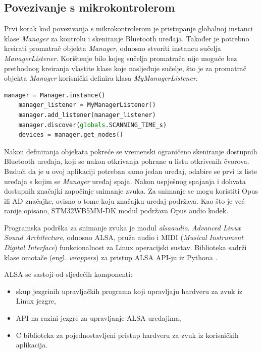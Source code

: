 \subsection{Povezivanje s mikrokontrolerom}

Prvi korak kod povezivanja s mikrokontrolerom je pristupanje globalnoj instanci klase \textit{Manager} za kontrolu i skeniranje Bluetooth uređaja. Također je potrebno kreirati promatrač objekta \textit{Manager}, odnosno stvoriti instancu sučelja \textit{ManagerListener}. Korištenje bilo kojeg sučelja promatrača nije moguće bez prethodnog kreiranja vlastite klase koje nasljeđuje sučelje, što je za promatrač objekta \textit{Manager} korisnički definira klasa \textit{MyManagerListener}. 

\begin{lstlisting}[language=Python, caption={Pristup instanci \textit{Manager} i skeniranje Bluetooth uređaja}]
	manager = Manager.instance()
	manager_listener = MyManagerListener()
	manager.add_listener(manager_listener)
	manager.discover(globals.SCANNING_TIME_s)
	devices = manager.get_nodes()
\end{lstlisting}

Nakon definiranja objekata pokreće se vremenski ograničeno skeniranje dostupnih Bluetooth uređaja, koji se nakon otkrivanja pohrane u listu otkrivenih čvorova. Budući da je u ovoj aplikaciji potreban samo jedan uređaj, odabire se prvi iz liste uređaja s kojim se \textit{Manager} uređaj spaja. Nakon uspješnog spajanja i dohvata dostupnih značajki započinje snimanje zvuka. Za snimanje se mogu koristiti Opus ili AD značajke, ovisno o tome koju značajku uređaj podržava. Kao što je već ranije opisano, STM32WB5MM-DK modul podržava Opus audio kodek.

Programska podrška za snimanje zvuka je modul \textit{alsaaudio}. \textit{Advanced Linux Sound Architecture}, odnosno ALSA, pruža audio i MIDI (\textit{Musical Instrument Digital Interface}) funkcionalnost za Linux operacijski sustav. Biblioteka sadrži klase omotače (engl. \textit{wrappers}) za pristup ALSA API-ju iz Pythona \cite{alsaaudio}. 

ALSA se sastoji od sljedećih komponenti:
\begin{itemize}
	\item skup jezgrinih upravljačkih programa koji upravljaju hardveru za zvuk iz Linux jezgre,
	\item API na razini jezgre za upravljanje ALSA uređajima, 
	\item C biblioteka za pojednostavljeni pristup hardveru za zvuk iz korisničkih aplikacija. 
\end{itemize}

